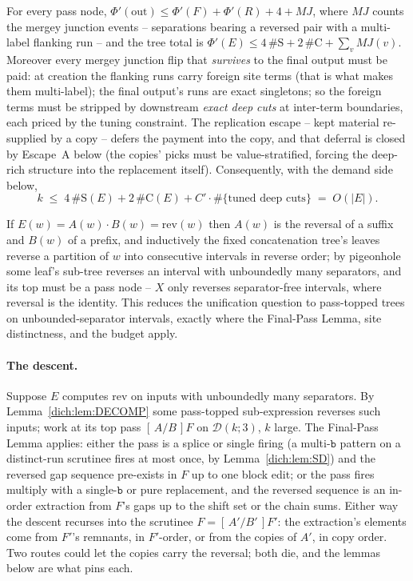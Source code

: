 \documentclass[runningheads,envcountsect]{llncs}
\begin{document}
\begin{lemma}
    \label{dich:lem:PAYMENT}
    For every pass node, $\Phi'(\mathrm{out}) \le \Phi'(F) + \Phi'(R) + 4 + MJ$, where $MJ$ counts the mergey junction events -- separations bearing a reversed pair with a multi-label flanking run -- and the tree total is $\Phi'(E) \le 4\,\#\mathrm{S} + 2\,\#\mathrm{C} + \sum_v MJ(v)$. Moreover every mergey junction flip that \emph{survives} to the final output must be paid: at creation the flanking runs carry foreign site terms (that is what makes them multi-label); the final output's runs are exact singletons; so the foreign terms must be stripped by downstream \emph{exact deep cuts} at inter-term boundaries, each priced by the tuning constraint. The replication escape -- kept material re-supplied by a copy -- defers the payment into the copy, and that deferral is closed by Escape~A below (the copies' picks must be value-stratified, forcing the deep-rich structure into the replacement itself). Consequently, with the demand side below,
    \begin{equation*}
        k \;\le\; 4\,\#\mathrm{S}(E) + 2\,\#\mathrm{C}(E) + C' \cdot \#\{\text{tuned deep cuts}\} \;=\; O(|E|).
    \end{equation*}

\end{lemma}

\begin{lemma}[decomposition]
    \label{dich:lem:DECOMP}
    If $E(w) = A(w) \cdot B(w) = \mathrm{rev}(w)$ then $A(w)$ is the reversal of a suffix and $B(w)$ of a prefix, and inductively the fixed concatenation tree's leaves reverse a partition of $w$ into consecutive intervals in reverse order; by pigeonhole some leaf's sub-tree reverses an interval with unboundedly many separators, and its top must be a pass node -- $X$ only reverses separator-free intervals, where reversal is the identity. This reduces the unification question to pass-topped trees on unbounded-separator intervals, exactly where the Final-Pass Lemma, site distinctness, and the budget apply.
\end{lemma}

\paragraph{The descent.}
Suppose $E$ computes $\mathrm{rev}$ on inputs with unboundedly many separators. By Lemma~\ref{dich:lem:DECOMP} some pass-topped sub-expression reverses such inputs; work at its top pass $[\,A/B\,]F$ on $\mathcal D(k;3)$, $k$ large. The Final-Pass Lemma applies: either the pass is a splice or single firing (a multi-$\mathtt b$ pattern on a distinct-run scrutinee fires at most once, by Lemma~\ref{dich:lem:SD}) and the reversed gap sequence pre-exists in $F$ up to one block edit; or the pass fires multiply with a single-$\mathtt b$ or pure replacement, and the reversed sequence is an in-order extraction from $F$'s gaps up to the shift set or the chain sums. Either way the descent recurses into the scrutinee $F = [\,A'/B'\,]F'$: the extraction's elements come from $F'$'s remnants, in $F'$-order, or from the copies of $A'$, in copy order. Two routes could let the copies carry the reversal; both die, and the lemmas below are what pins each.
\end{document}
